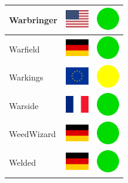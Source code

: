 \documentclass[12pt, a4paper, twoside]{report}
\begin{document}
\begin{center}
\begin{longtable}{|p{5cm}|p{2cm}|p{2cm}|}
 Warbringer                                                 & \includegraphics[width=1cm]{../4x3/us} &   \includegraphics[width=1cm]{../likes/y} \\ \hline
 Warfield                                                   & \includegraphics[width=1cm]{../4x3/de} &   \includegraphics[width=1cm]{../likes/y} \\ \hline
 Warkings                                                   & \includegraphics[width=1cm]{../4x3/eu} &   \includegraphics[width=1cm]{../likes/m} \\ \hline
 Warside                                                    & \includegraphics[width=1cm]{../4x3/fr} &   \includegraphics[width=1cm]{../likes/y} \\ \hline
 WeedWizard                                                 & \includegraphics[width=1cm]{../4x3/de} &   \includegraphics[width=1cm]{../likes/y} \\ \hline
 Welded                                                     & \includegraphics[width=1cm]{../4x3/de} &   \includegraphics[width=1cm]{../likes/y} \\ \hline

\end{longtable}
\end{center}
\end{document}
